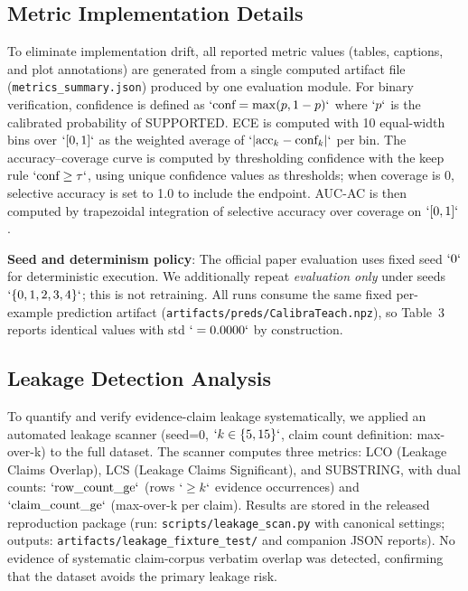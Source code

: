 \subsection{Metric Implementation Details}\label{metric-implementation-details}

To eliminate implementation drift, all reported metric values (tables, captions, and plot annotations) are generated from a single computed artifact file (\texttt{metrics\_summary.json}) produced by one evaluation module. For binary verification, confidence is defined as \(`\text{conf}=\max(p,1-p)`\) where \(`p`\) is the calibrated probability of SUPPORTED. ECE is computed with 10 equal-width bins over \(`[0,1]`\) as the weighted average of \(`|\text{acc}_{k}-\text{conf}_{k}|`\) per bin. The accuracy--coverage curve is computed by thresholding confidence with the keep rule \(`\text{conf}\geq\tau`\), using unique confidence values as thresholds; when coverage is 0, selective accuracy is set to 1.0 to include the endpoint. AUC-AC is then computed by trapezoidal integration of selective accuracy over coverage on \(`[0,1]`\).

\textbf{Seed and determinism policy}: The official paper evaluation uses fixed seed \(`0`\) for deterministic execution. We additionally repeat \emph{evaluation only} under seeds \(`\{0,1,2,3,4\}`\); this is not retraining. All runs consume the same fixed per-example prediction artifact (\texttt{artifacts/preds/CalibraTeach.npz}), so Table~3 reports identical values with std \(`=0.0000`\) by construction.

\subsection{Leakage Detection Analysis}\label{leakage-detection-analysis}

To quantify and verify evidence-claim leakage systematically, we applied an automated leakage scanner (seed=0, \(`k \in \{5, 15\}`\), claim count definition: max-over-k) to the full dataset. The scanner computes three metrics: LCO (Leakage Claims Overlap), LCS (Leakage Claims Significant), and SUBSTRING, with dual counts: \(`\text{row\_count\_ge}`\) (rows \(`\geq k`\) evidence occurrences) and \(`\text{claim\_count\_ge}`\) (max-over-k per claim). Results are stored in the released reproduction package (run: \texttt{scripts/leakage\_scan.py} with canonical settings; outputs: \texttt{artifacts/leakage\_fixture\_test/} and companion JSON reports). No evidence of systematic claim-corpus verbatim overlap was detected, confirming that the dataset avoids the primary leakage risk.


